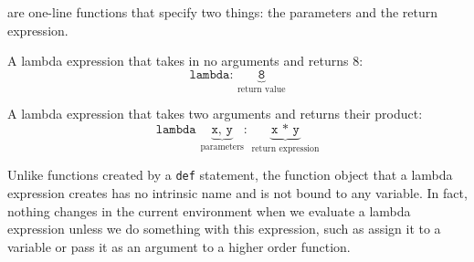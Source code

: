  are one-line functions that specify two things: the parameters and the return expression. 
 
A lambda expression that takes in no arguments and returns 8:
\begin{equation*}
    \texttt{lambda: }
    \underbrace{\texttt{8}}_\text{return value}
\end{equation*}

A lambda expression that takes two arguments and returns their product:
\begin{equation*} 
	\texttt{lambda }
	\underbrace{\texttt{x, y}}_\text{parameters}
	\texttt{: }
	\underbrace{\texttt{x * y}}_\text{return expression}
\end{equation*}

Unlike functions created by a \texttt{def} statement, the function object that a lambda expression creates has no intrinsic name and is not bound to any variable. In fact, nothing changes in the current environment when we evaluate a lambda expression unless we do something with this expression, such as assign it to a variable or pass it as an argument to a higher order function.	